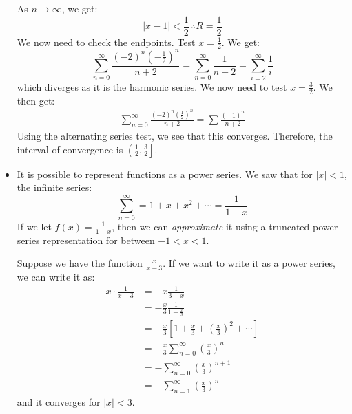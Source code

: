 \begin{itemize}
\begin{example}
\begin{equation}
        \end{equation}
        As $n\to\infty$, we get:
        \begin{equation}
            |x-1| < \frac{1}{2}\, \therefore R = \frac{1}{2}
        \end{equation}
        We now need to check the endpoints. Test $x=\frac{1}{2}$. We get:
        \begin{equation}
            \sum_{n=0}^\infty \frac{(-2)^n \left(-\frac{1}{2}\right)^n}{n+2} = \sum_{n=0}^\infty \frac{1}{n+2} = \sum_{i=2}^\infty \frac{1}{i}
        \end{equation}
        which diverges as it is the harmonic series. We now need to test $x=\frac{3}{2}$. We then get:
        \begin{align}
            \sum_{n=0}^\infty \frac{(-2)^n\left(\frac{1}{2}\right)^n}{n+2} = \sum \frac{(-1)^n}{n+2}
        \end{align}
        Using the alternating series test, we see that this converges. Therefore, the interval of convergence is $\left(\frac{1}{2}, \frac{3}{2}\right]$.
    \end{example}
    \item It is possible to represent functions as a power series. We saw that for $|x|<1$, the infinite series:
    \begin{equation}
        \sum_{n=0}^\infty = 1 + x + x^2 + \cdots = \frac{1}{1-x}
    \end{equation}
    If we let $f(x) = \frac{1}{1-x}$, then we can \textit{approximate} it using a truncated power series representation for between $-1<x<1$.
    \begin{example}
        Suppose we have the function $\frac{x}{x-3}$. If we want to write it as a power series, we can write it as:
        \begin{align}
            x \cdot \frac{1}{x-3} &= -x \frac{1}{3-x} \\ 
            &= -\frac{x}{3} \frac{1}{1-\frac{x}{3}} \\ 
            &= -\frac{x}{3}\left[1+\frac{x}{3}+\left(\frac{x}{3}\right)^2+\cdots\right] \\ 
            &= -\frac{x}{3} \sum_{n=0}^\infty \left(\frac{x}{3}\right)^n \\ 
            &= -\sum_{n=0}^\infty \left(\frac{x}{3}\right)^{n+1} \\ 
            &= -\sum_{n=1}^\infty \left(\frac{x}{3}\right)^n
        \end{align}
        and it converges for $|x|<3$.
    \end{example}

\end{itemize}
